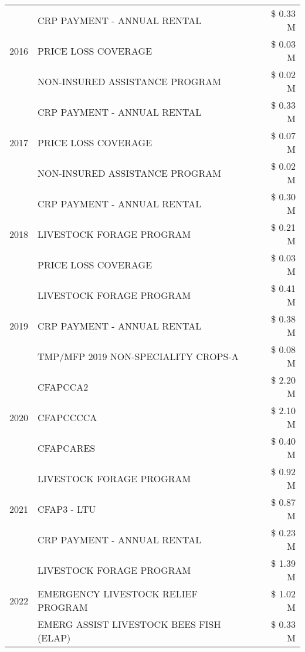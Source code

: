 \begin{tabular}{llr}
\cline{1-3}
\multirow[t]{3}{*}{2016} & CRP PAYMENT - ANNUAL RENTAL & \$ 0.33 M \\
 & PRICE LOSS COVERAGE & \$ 0.03 M \\
 & NON-INSURED ASSISTANCE PROGRAM & \$ 0.02 M \\
\cline{1-3}
\multirow[t]{3}{*}{2017} & CRP PAYMENT - ANNUAL RENTAL & \$ 0.33 M \\
 & PRICE LOSS COVERAGE & \$ 0.07 M \\
 & NON-INSURED ASSISTANCE PROGRAM & \$ 0.02 M \\
\cline{1-3}
\multirow[t]{3}{*}{2018} & CRP PAYMENT - ANNUAL RENTAL & \$ 0.30 M \\
 & LIVESTOCK FORAGE PROGRAM & \$ 0.21 M \\
 & PRICE LOSS COVERAGE & \$ 0.03 M \\
\cline{1-3}
\multirow[t]{3}{*}{2019} & LIVESTOCK FORAGE PROGRAM & \$ 0.41 M \\
 & CRP PAYMENT - ANNUAL RENTAL & \$ 0.38 M \\
 & TMP/MFP 2019 NON-SPECIALITY CROPS-A & \$ 0.08 M \\
\cline{1-3}
\multirow[t]{3}{*}{2020} & CFAPCCA2 & \$ 2.20 M \\
 & CFAPCCCCA & \$ 2.10 M \\
 & CFAPCARES & \$ 0.40 M \\
\cline{1-3}
\multirow[t]{3}{*}{2021} & LIVESTOCK FORAGE PROGRAM & \$ 0.92 M \\
 & CFAP3 - LTU & \$ 0.87 M \\
 & CRP PAYMENT - ANNUAL RENTAL & \$ 0.23 M \\
\cline{1-3}
\multirow[t]{3}{*}{2022} & LIVESTOCK FORAGE PROGRAM & \$ 1.39 M \\
 & EMERGENCY LIVESTOCK RELIEF PROGRAM & \$ 1.02 M \\
 & EMERG ASSIST LIVESTOCK BEES FISH (ELAP) & \$ 0.33 M \\
\cline{1-3}
\bottomrule
\end{tabular}
